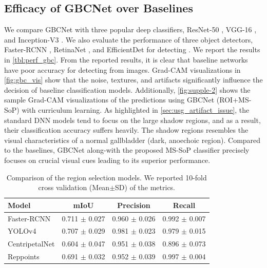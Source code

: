 \subsection{Efficacy of GBCNet over Baselines}
%
We compare GBCNet with three popular deep classifiers, ResNet-50 \cite{resnet}, VGG-16 \cite{vgg}, and Inception-V3 \cite{inception}. We also evaluate the performance of three \sota object detectors, Faster-RCNN \cite{fasterrcnn}, RetinaNet \cite{retinanet}, and EfficientDet \cite{efficientdet} for detecting \gbc. We report the results in \cref{tbl:perf_gbc}. From the reported results, it is clear that baseline networks have poor accuracy for detecting \gbc from \usg images. Grad-CAM \cite{gradcam} visualizations in \cref{fig:gbc_vis} show that the noise, textures, and artifacts significantly influence the decision of baseline classification models. Additionally, \cref{fig:supple-2} shows the sample Grad-CAM visualizations of the predictions using GBCNet (ROI+MS-SoP) with curriculum learning. As highlighted in \cref{sec:usg_artifact_issue}, the standard DNN models tend to focus on the large shadow regions, and as a result, their classification accuracy suffers heavily. The shadow regions resembles the visual characteristics of a normal gallbladder (dark, anoechoic region). Compared to the baselines, GBCNet along-with the proposed MS-SoP classifier precisely focuses on crucial visual cues leading to its superior performance. 
%
\begin{table}[t]
	\centering
	\footnotesize
    \begin{tabular}{@{}lccc@{}}
    \toprule[1pt]
    \textbf{Model} & \textbf{mIoU} & \textbf{Precision} & \textbf{Recall} \\
    \midrule[0.5pt]
    Faster-RCNN & 0.711 $\pm$ 0.027 &  0.960 $\pm$ 0.026 & 0.992 $\pm$ 0.007\\
    YOLOv4  & 0.707 $\pm$ 0.029 & 0.981 $\pm$ 0.023 & 0.979 $\pm$ 0.015 \\
    CentripetalNet & 0.604 $\pm$ 0.047 & 0.951 $\pm$ 0.038 & 0.896 $\pm$ 0.073 \\
    Reppoints & 0.691 $\pm$ 0.032 & 0.952 $\pm$ 0.039 & 0.997 $\pm$ 0.004\\
    \bottomrule[1pt]
    \end{tabular}
	\caption[Comparison of the \gb region selection models]{Comparison of the \gb region selection models. We reported 10-fold cross validation (Mean$\pm$SD) of the metrics.}
\label{tbl:perf_region}
\end{table}
